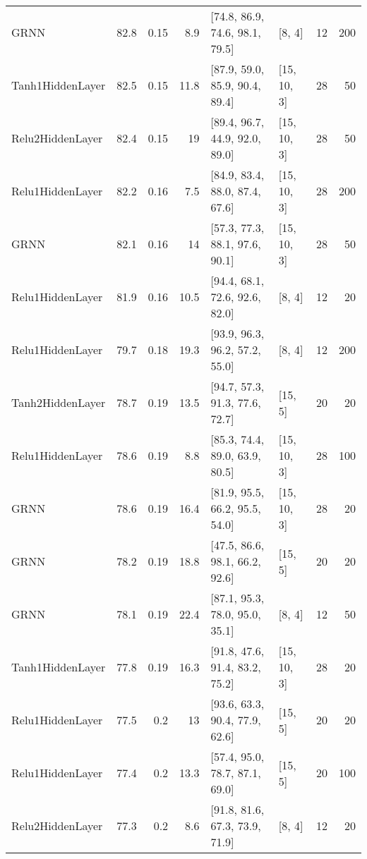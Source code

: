 \begin{table*}
\begin{tabular}{lrrrllrr}
 GRNN               & 82.8 &  0.15 &      8.9 & [74.8, 86.9, 74.6, 98.1, 79.5]  & [8, 4]         &         12 &      200 \\
 Tanh1HiddenLayer   & 82.5 &  0.15 &     11.8 & [87.9, 59.0, 85.9, 90.4, 89.4]  & [15, 10, 3]    &         28 &       50 \\
 Relu2HiddenLayer   & 82.4 &  0.15 &     19   & [89.4, 96.7, 44.9, 92.0, 89.0]  & [15, 10, 3]    &         28 &       50 \\
 Relu1HiddenLayer   & 82.2 &  0.16 &      7.5 & [84.9, 83.4, 88.0, 87.4, 67.6]  & [15, 10, 3]    &         28 &      200 \\
 GRNN               & 82.1 &  0.16 &     14   & [57.3, 77.3, 88.1, 97.6, 90.1]  & [15, 10, 3]    &         28 &       50 \\
 Relu1HiddenLayer   & 81.9 &  0.16 &     10.5 & [94.4, 68.1, 72.6, 92.6, 82.0]  & [8, 4]         &         12 &       20 \\
 Relu1HiddenLayer   & 79.7 &  0.18 &     19.3 & [93.9, 96.3, 96.2, 57.2, 55.0]  & [8, 4]         &         12 &      200 \\
 Tanh2HiddenLayer   & 78.7 &  0.19 &     13.5 & [94.7, 57.3, 91.3, 77.6, 72.7]  & [15, 5]        &         20 &       20 \\
 Relu1HiddenLayer   & 78.6 &  0.19 &      8.8 & [85.3, 74.4, 89.0, 63.9, 80.5]  & [15, 10, 3]    &         28 &      100 \\
 GRNN               & 78.6 &  0.19 &     16.4 & [81.9, 95.5, 66.2, 95.5, 54.0]  & [15, 10, 3]    &         28 &       20 \\
 GRNN               & 78.2 &  0.19 &     18.8 & [47.5, 86.6, 98.1, 66.2, 92.6]  & [15, 5]        &         20 &       20 \\
 GRNN               & 78.1 &  0.19 &     22.4 & [87.1, 95.3, 78.0, 95.0, 35.1]  & [8, 4]         &         12 &       50 \\
 Tanh1HiddenLayer   & 77.8 &  0.19 &     16.3 & [91.8, 47.6, 91.4, 83.2, 75.2]  & [15, 10, 3]    &         28 &       20 \\
 Relu1HiddenLayer   & 77.5 &  0.2  &     13   & [93.6, 63.3, 90.4, 77.9, 62.6]  & [15, 5]        &         20 &       20 \\
 Relu1HiddenLayer   & 77.4 &  0.2  &     13.3 & [57.4, 95.0, 78.7, 87.1, 69.0]  & [15, 5]        &         20 &      100 \\
 Relu2HiddenLayer   & 77.3 &  0.2  &      8.6 & [91.8, 81.6, 67.3, 73.9, 71.9]  & [8, 4]         &         12 &       20 \\

\end{tabular}
\end{table*}
